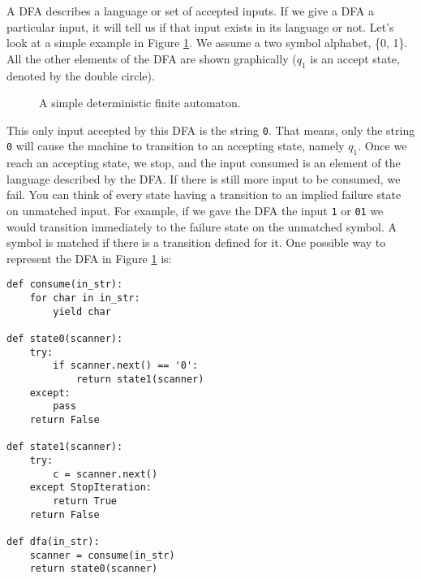 A DFA describes a language or set of accepted inputs.  
If we give a DFA a particular input, it will tell us if that input exists in its language or not.
Let's look at a simple example in Figure \ref{fig:simple_dfa}.  We assume a two symbol alphabet, \{0, 1\}.  All the other elements of the DFA are shown graphically ($q_1$ is an accept state, denoted by the double circle).
\begin{figure}
\caption{A simple deterministic finite automaton.}
\label{fig:simple_dfa}
\end{figure}
This only input accepted by this DFA is the string \texttt{0}.
That means, only the string \texttt{0} will cause the machine to transition to an accepting state, namely $q_1$.  Once we reach an accepting state, we stop, and the input consumed is an element of the language described by the DFA.
If there is still more input to be consumed, we fail.
You can think of every state having a transition to an implied failure state on unmatched input.
For example, if we gave the DFA the input \texttt{1} or \texttt{01} we would transition immediately to the failure state on the unmatched symbol.  A symbol is matched if there is a transition defined for it.
One possible way to represent the DFA in Figure \ref{fig:simple_dfa} is:
\begin{lstlisting}
def consume(in_str):
    for char in in_str:
        yield char
    
def state0(scanner):
    try:
        if scanner.next() == '0':
            return state1(scanner)
    except:
        pass
    return False
    
def state1(scanner):
    try:
        c = scanner.next()
    except StopIteration:
        return True
    return False
    
def dfa(in_str):
    scanner = consume(in_str)
    return state0(scanner)
\end{lstlisting}


